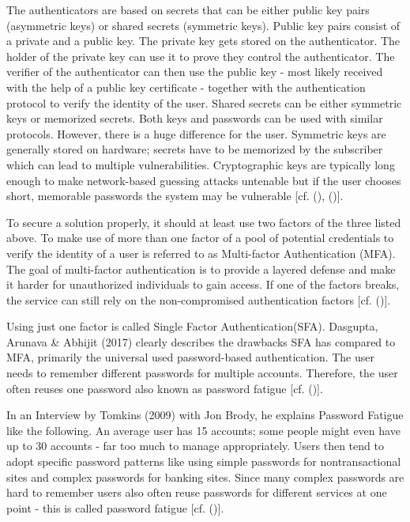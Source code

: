 The authenticators are based on secrets that can be either public key pairs (asymmetric keys) or shared secrets (symmetric keys). Public key pairs consist of a private and a public key. The private key gets stored on the authenticator. The holder of the private key can use it to prove they control the authenticator. The verifier of the authenticator can then use the public key - most likely received with the help of a public key certificate - together with the authentication protocol to verify the identity of the user. Shared secrets can be either symmetric keys or memorized secrets. Both keys and passwords can be used with similar protocols. However, there is a huge difference for the user. Symmetric keys are generally stored on hardware; secrets have to be memorized by the subscriber which can lead to multiple vulnerabilities. Cryptographic keys are typically long enough to make network-based guessing attacks untenable but if the user chooses short, memorable passwords the system may be vulnerable [cf. (\cite{NIST:2017:DIG}), (\cite{Dasgupta:2017:AUA})]. 


To secure a solution properly, it should at least use two factors of the three listed above. To make use of more than one factor of a pool of potential credentials to verify the identity of a user is referred to as Multi-factor Authentication (MFA). The goal of multi-factor authentication is to provide a layered defense and make it harder for unauthorized individuals to gain access. If one of the factors breaks, the service can still rely on the non-compromised authentication factors [cf. (\cite{Dasgupta:2017:AUA})].

Using just one factor is called Single Factor Authentication(SFA). Dasgupta, Arunava \& Abhijit (2017) clearly describes the drawbacks SFA has compared to MFA, primarily the universal used password-based authentication. The user needs to remember different passwords for multiple accounts. Therefore, the user often reuses one password also known as password fatigue [cf. (\cite{Dasgupta:2017:AUA})].

In an Interview by Tomkins (2009) with Jon Brody, he explains Password Fatigue like the following. An average user has 15 accounts; some people might even have up to 30 accounts - far too much to manage appropriately. Users then tend to adopt specific password patterns like using simple passwords for nontransactional sites and complex passwords for banking sites. Since many complex passwords are hard to remember users also often reuse passwords for different services at one point - this is called password fatigue [cf. (\cite{Tomkins:2009:DPF})]. 

